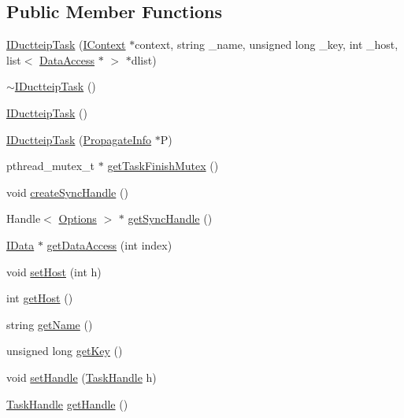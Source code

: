 \subsection*{Public Member Functions}
\begin{DoxyCompactItemize}
\item 
\hyperlink{class_i_ductteip_task_af6e8ba2a01f02e8a354831083d27d6c5}{IDuctteipTask} (\hyperlink{class_i_context}{IContext} $\ast$context, string \_\-name, unsigned long \_\-key, int \_\-host, list$<$ \hyperlink{struct_data_access}{DataAccess} $\ast$ $>$ $\ast$dlist)
\item 
\hyperlink{class_i_ductteip_task_a3cd60ba06a40fc003699bc87ec8c2f54}{$\sim$IDuctteipTask} ()
\item 
\hyperlink{class_i_ductteip_task_ac3e5ee9cc9a149d2d1fdcaf4f9bb6d4e}{IDuctteipTask} ()
\item 
\hyperlink{class_i_ductteip_task_a9829e9023aab8fa4bc8e54f0064fff9a}{IDuctteipTask} (\hyperlink{struct_propagate_info}{PropagateInfo} $\ast$P)
\item 
pthread\_\-mutex\_\-t $\ast$ \hyperlink{class_i_ductteip_task_a1f3ee21dbaeab6688bcc6bda4a9355ca}{getTaskFinishMutex} ()
\item 
void \hyperlink{class_i_ductteip_task_aac8c7bc01da3981e2080293b4337f576}{createSyncHandle} ()
\item 
Handle$<$ \hyperlink{struct_options}{Options} $>$ $\ast$ \hyperlink{class_i_ductteip_task_aed04ae7b68a5456ab60617c639da4f45}{getSyncHandle} ()
\item 
\hyperlink{class_i_data}{IData} $\ast$ \hyperlink{class_i_ductteip_task_a403052cd9aa617520ccf192f79b862b9}{getDataAccess} (int index)
\item 
void \hyperlink{class_i_ductteip_task_abbdb78cf7dc2e655b704e42fd344f4fb}{setHost} (int h)
\item 
int \hyperlink{class_i_ductteip_task_aff5c45921ef7de2e0a0261477fdbd323}{getHost} ()
\item 
string \hyperlink{class_i_ductteip_task_aff428fcafc7ce7f6aa9f281febead30a}{getName} ()
\item 
unsigned long \hyperlink{class_i_ductteip_task_adfbcbcb284c9dba335ce519bc27d4ff1}{getKey} ()
\item 
void \hyperlink{class_i_ductteip_task_a1f1f64d2c28f10f03516d242e3674a7f}{setHandle} (\hyperlink{task_8hpp_a189c327d368d47849e32f5dfcb3c5f45}{TaskHandle} h)
\item 
\hyperlink{task_8hpp_a189c327d368d47849e32f5dfcb3c5f45}{TaskHandle} \hyperlink{class_i_ductteip_task_ab4eb87b3c109c4a5c8a74c928ea3b8b5}{getHandle} ()

\end{DoxyCompactItemize}
